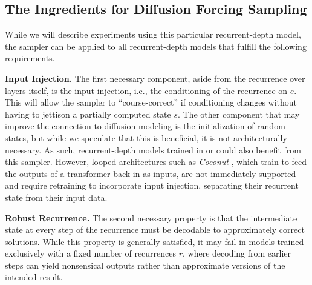 \documentclass{article} %
\theoremstyle{definition}
\theoremstyle{plain}
\begin{document}
\subsection{The Ingredients for Diffusion Forcing Sampling} 
While we will describe experiments using this particular recurrent-depth model, the sampler can be applied to all recurrent-depth models that fulfill the following requirements. 


\textbf{Input Injection.}
The first necessary component, aside from the recurrence over layers itself, is the input injection, i.e., the conditioning of the recurrence on $e$. This will allow the sampler to ``course-correct'' if conditioning changes without having to jettison a partially computed state $s$. The other component that may improve the connection to diffusion modeling is the initialization of random states, but while we speculate that this is beneficial, it is not architecturally necessary. As such, recurrent-depth models trained in \citet{csordas_moeut_2024,schone_implicit_2025,mohtashami_cotformer_2024} or \citet{wang_hierarchical_2025} could also benefit from this sampler. However, looped architectures such as \textit{Coconut} \citep{hao_training_2024}, which train to feed the outputs of a transformer back in as inputs, are not immediately supported and require retraining to incorporate input injection, separating their recurrent state from their input data.

\textbf{Robust Recurrence.} The second necessary property is that the intermediate state at every step of the recurrence must be decodable to approximately correct solutions. While this property is generally satisfied, it may fail in models trained exclusively with a fixed number of recurrences $r$, where decoding from earlier steps can yield nonsensical outputs rather than approximate versions of the intended result.
\end{document}
